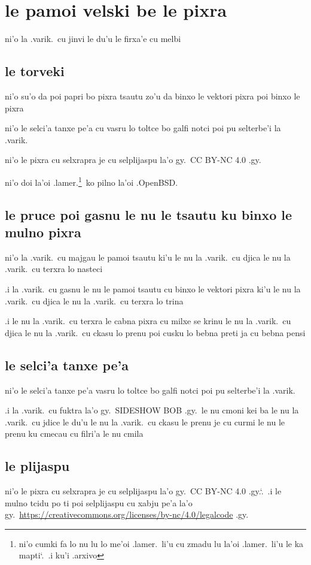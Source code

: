 \documentclass{report}
\newcommand\sds{\spacefactor\sfcode`.\ \space}
\begin{document}
\section{le pamoi velski be le pixra}
ni'o la .varik.\ cu jinvi le du'u le firxa'e cu melbi

\subsection{le torveki}
ni'o su'o da poi papri bo pixra tsautu zo'u da binxo le vektori pixra poi binxo le pixra

ni'o le selci'a tanxe pe'a cu vasru lo toltce bo galfi notci poi pu selterbe'i la .varik.

ni'o le pixra cu selxrapra je cu selplijaspu la'o gy.\ CC BY-NC 4.0 .gy.

ni'o doi la'oi .lamer.\footnote{ni'o cumki fa lo nu lu lo me'oi .lamer.\ li'u cu zmadu lu la'oi .lamer.\ li'u le ka mapti\sds  .i ku'i .arxivo}\ ko pilno la'oi .OpenBSD.

\subsection{le pruce poi gasnu le nu le tsautu ku binxo le mulno pixra}
ni'o la .varik.\ cu majgau le pamoi tsautu ki'u le nu la .varik.\ cu djica le nu la .varik.\ cu terxra lo nasteci

.i la .varik.\ cu gasnu le nu le pamoi tsautu cu binxo le vektori pixra ki'u le nu la .varik.\ cu djica le nu la .varik.\ cu terxra lo trina

.i le nu la .varik.\ cu terxra le cabna pixra cu milxe se krinu le nu la .varik.\ cu djica le nu la .varik.\ cu ckasu lo prenu poi cusku lo bebna preti ja cu bebna pensi

\subsection{le selci'a tanxe pe'a}
ni'o le selci'a tanxe pe'a vasru lo toltce bo galfi notci poi pu selterbe'i la .varik.

.i la .varik.\ cu fuktra la'o gy.\ SIDESHOW BOB .gy.\ le nu cmoni kei ba le nu la .varik.\ cu jdice le du'u le nu la .varik.\ cu ckasu le prenu je cu curmi le nu le prenu ku cmecau cu filri'a le nu cmila

\subsection{le plijaspu}
ni'o le pixra cu selxrapra je cu selplijaspu la'o gy.\ CC BY-NC 4.0 .gy.\sds  .i le mulno tcidu po ti poi selplijaspu cu xabju pe'a la'o gy.\ \url{https://creativecommons.org/licenses/by-nc/4.0/legalcode} .gy.
\end{document}
